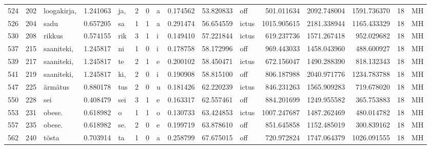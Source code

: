 \begin{tabular}{lrlrllllrrlrrrll}
524  &         202 &      loogakirja, &  1.241063 &     ja, &        2 &      0 &       a &      0.174562 &     53.820833 &    off &   501.011634 &  2092.748004 &  1591.736370 &     18 &        MH \\
526  &         204 &             sadu &  0.657205 &      sa &        1 &      1 &       a &      0.291474 &     56.654559 &  ictus &  1015.905615 &  2181.338944 &  1165.433329 &     18 &        MH \\
530  &         208 &           rikkus &  0.574155 &     rik &        3 &      1 &       i &      0.149410 &     57.221844 &  ictus &   619.237736 &  1571.267418 &   952.029682 &     18 &        MH \\
537  &         215 &       saaniteki, &  1.245817 &      ni &        1 &      0 &       i &      0.178758 &     58.172996 &    off &   969.443033 &  1458.043960 &   488.600927 &     18 &        MH \\
539  &         217 &       saaniteki, &  1.245817 &      te &        2 &      1 &       e &      0.200102 &     58.450471 &  ictus &   672.156047 &  1490.288390 &   818.132343 &     18 &        MH \\
541  &         219 &       saaniteki, &  1.245817 &     ki, &        2 &      0 &       i &      0.190908 &     58.815100 &    off &   806.187988 &  2040.971776 &  1234.783788 &     18 &        MH \\
547  &         225 &          ärmätus &  0.880178 &     tus &        2 &      0 &       u &      0.181426 &     62.220239 &  ictus &   846.231263 &  1565.909283 &   719.678020 &     18 &        MH \\
550  &         228 &              sei &  0.408479 &     sei &        3 &      1 &       e &      0.163317 &     62.557461 &    off &   884.201699 &  1249.955582 &   365.753883 &     18 &        MH \\
553  &         231 &           obese. &  0.618982 &       o &        1 &      1 &       o &      0.130733 &     63.424853 &  ictus &  1007.247687 &  1487.262469 &   480.014782 &     18 &        MH \\
557  &         235 &           obese. &  0.618982 &     se. &        2 &      0 &       e &      0.199719 &     63.878610 &    off &   851.645858 &  1152.485019 &   300.839162 &     18 &        MH \\
562  &         240 &            tõsta &  0.703914 &      ta &        1 &      0 &       a &      0.258799 &     67.675015 &    off &   720.972824 &  1747.064379 &  1026.091555 &     18 &        MH \\

\end{tabular}
